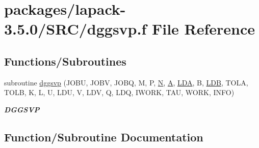 \hypertarget{dggsvp_8f}{}\section{packages/lapack-\/3.5.0/\+S\+R\+C/dggsvp.f File Reference}
\label{dggsvp_8f}
\subsection*{Functions/\+Subroutines}
\begin{DoxyCompactItemize}
\item 
subroutine \hyperlink{dggsvp_8f_a82130cf3f0801366c02d2b46ea7bd908}{dggsvp} (J\+O\+B\+U, J\+O\+B\+V, J\+O\+B\+Q, M, P, \hyperlink{polmisc_8c_a0240ac851181b84ac374872dc5434ee4}{N}, \hyperlink{classA}{A}, \hyperlink{example__user_8c_ae946da542ce0db94dced19b2ecefd1aa}{L\+D\+A}, B, \hyperlink{example__user_8c_a50e90a7104df172b5a89a06c47fcca04}{L\+D\+B}, T\+O\+L\+A, T\+O\+L\+B, K, L, U, L\+D\+U, V, L\+D\+V, Q, L\+D\+Q, I\+W\+O\+R\+K, T\+A\+U, W\+O\+R\+K, I\+N\+F\+O)
\begin{DoxyCompactList}\small\item\em {\bfseries D\+G\+G\+S\+V\+P} \end{DoxyCompactList}\end{DoxyCompactItemize}


\subsection{Function/\+Subroutine Documentation}
\hypertarget{dggsvp_8f_a82130cf3f0801366c02d2b46ea7bd908}{}
